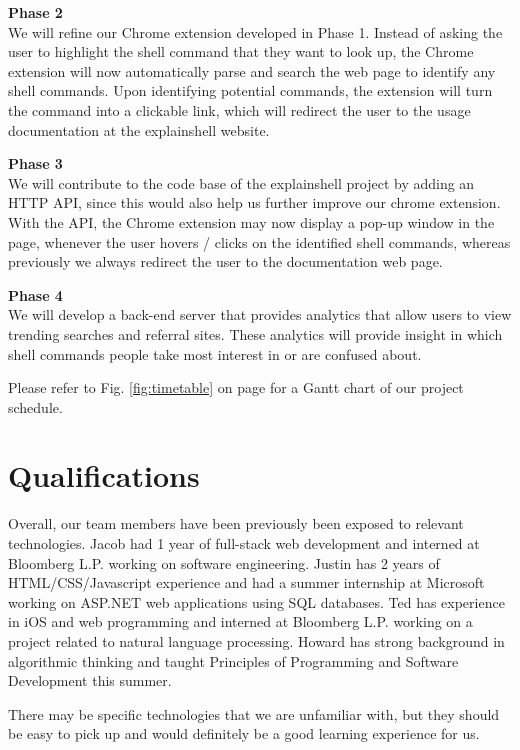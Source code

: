 \documentclass[11pt]{article}
\begin{document}
\par{\bf Phase 2}\\
We will refine our Chrome extension developed in Phase 1. Instead of asking the user to highlight the shell command that they want to look up, the Chrome extension will now automatically parse and search the web page to identify any shell commands. Upon identifying potential commands, the extension will turn the command into a clickable link, which will redirect the user to the usage documentation at the explainshell website.

\par{\bf Phase 3}\\
We will contribute to the code base of the explainshell project by adding an HTTP API, since this would also help us further improve our chrome extension. With the API, the Chrome extension may now display a pop-up window in the page, whenever the user hovers / clicks on the identified shell commands, whereas previously we always redirect the user to the documentation web page.

\par{\bf Phase 4}\\
We will develop a back-end server that provides analytics that allow users to view trending searches and referral sites. These analytics will provide insight in which shell commands people take most interest in or are confused about.

Please refer to Fig. \ref{fig:timetable} on page \pageref{fig:timetable} for a Gantt chart of our project schedule.

\section{Qualifications}

Overall, our team members have been previously been exposed to relevant technologies. Jacob had 1 year of full-stack web development and interned at Bloomberg L.P. working on software engineering. Justin has 2 years of HTML/CSS/Javascript experience and had a summer internship at Microsoft working on ASP.NET web applications using SQL databases. Ted has experience in iOS and web programming and interned at Bloomberg L.P. working on a project related to natural language processing. Howard has strong background in algorithmic thinking and taught Principles of Programming and Software Development this summer. 

There may be specific technologies that we are unfamiliar with, but they should be easy to pick up and would definitely be a good learning experience for us.
\end{document}
